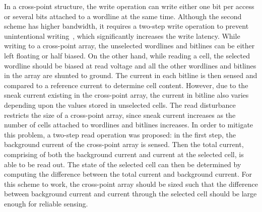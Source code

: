 In a cross-point structure, the write operation can write either one bit
per access or several bits attached to a wordline at the same time.
Although the second scheme has higher bandwidth, it requires a two-step
write operation to prevent unintentional writing~\cite{memristor:Cong},
which significantly increases the write latency.
While writing to a cross-point array, the unselected wordlines and
bitlines can be either left floating or half biased. On the other hand,
while reading a cell, the selected wordline should be biased at read
voltage and all the other wordlines and bitlines in the array are shunted to
ground. The current in each bitline is then sensed and compared to a
reference current to determine cell content. However, due to the sneak
current existing in the cross-point array, the current in bitline also
varies depending upon the values stored in unselected cells.
The read disturbance restricts the size of a cross-point
array, since sneak current increases as the number of cells attached to
wordlines and bitlines increases. In order to mitigate this problem, a two-step
read operation was proposed: in the first step, the background current of
the cross-point array  is sensed. Then the total current, comprising
of both the background current and current at the selected cell, is able to be
read out. The state of the selected cell can then be determined by
computing the difference between the total current and background current.
For this scheme to work, the cross-point array should be sized such that
the difference between background current and current through the selected
cell should be large enough for reliable sensing.



